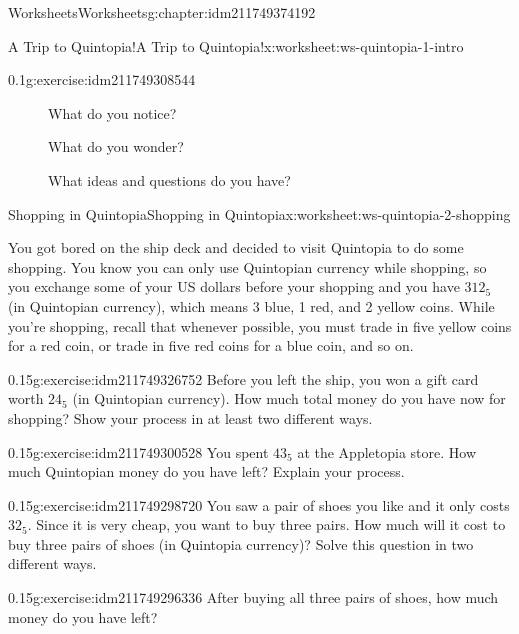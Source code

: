 \documentclass[twoside,11pt,]{book}
\begin{document}
\begin{chapterptx}{Worksheets}{}{Worksheets}{}{}{g:chapter:idm211749374192}
\begin{worksheet-section-numberless}{A Trip to Quintopia!}{}{A Trip to Quintopia!}{}{}{x:worksheet:ws-quintopia-1-intro}
\begin{divisionexercise}{2}{}{0.1}{g:exercise:idm211749308544}
\begin{description}
\item[{}]What do you notice?\item[{}]What do you wonder?\item[{}]What ideas and questions do you have?\end{description}
\end{divisionexercise}%
\end{worksheet-section-numberless}
\restoregeometry
%
%
\typeout{************************************************}
\typeout{************************************************}
%
\begin{worksheet-section-numberless}{Shopping in Quintopia}{}{Shopping in Quintopia}{}{}{x:worksheet:ws-quintopia-2-shopping}
\begin{introduction}{}%
You got bored on the ship deck and decided to visit Quintopia to do some shopping. You know you can only use Quintopian currency while shopping, so you exchange some of your US dollars before your shopping and you have \(312_{5}\) (in Quintopian currency), which means 3 blue, 1 red, and 2 yellow coins. While you’re shopping, recall that whenever possible, you must trade in five yellow coins for a red coin, or trade in five red coins for a blue coin, and so on.%
\end{introduction}%
\begin{divisionexercise}{1}{}{0.15}{g:exercise:idm211749326752}%
Before you left the ship, you won a gift card worth \(24_{5}\) (in Quintopian currency). How much total money do you have now for shopping? Show your process in at least two different ways.%
\end{divisionexercise}%
\begin{divisionexercise}{2}{}{0.15}{g:exercise:idm211749300528}%
You spent \(43_{5}\) at the Appletopia store. How much Quintopian money do you have left?  Explain your process.%
\end{divisionexercise}%
\begin{divisionexercise}{3}{}{0.15}{g:exercise:idm211749298720}%
You saw a pair of shoes you like and it only costs \(32_{5}\). Since it is very cheap, you want to buy three pairs. How much will it cost to buy three pairs of shoes (in Quintopia currency)? Solve this question in two different ways.%
\end{divisionexercise}%
\clearpage
\begin{divisionexercise}{4}{}{0.15}{g:exercise:idm211749296336}%
After buying all three pairs of shoes, how much money do you have left?%

\end{divisionexercise}
\end{worksheet-section-numberless}
\end{chapterptx}
\end{document}
